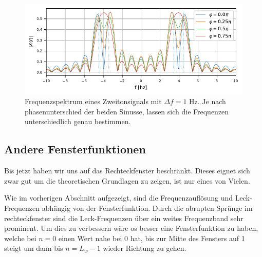 \begin{figure}
    \centering
    \includegraphics{papers/sonogramm/images/twoharmphasediff.pdf}
    \caption{Frequenzspektrum eines Zweitonsignals mit $\Delta f = 1$ Hz.
    Je nach phasenunterschied der beiden Sinusse, lassen sich die Frequenzen unterschiedlich
    genau bestimmen.
    \label{sonogramm:freqdiffdemo}
    }
\end{figure}

\subsection{Andere Fensterfunktionen}
Bis jetzt haben wir uns auf das Rechteckfenster beschränkt.
Dieses eignet sich zwar gut um die theoretischen Grundlagen zu zeigen,
ist nur eines von Vielen.

Wie im vorherigen Abschnitt aufgezeigt, sind die Frequenzauflösung und 
Leck-Frequenzen abhängig von der Fensterfunktion.
Durch die abrupten Sprünge im rechteckfenster sind die Leck-Frequenzen 
über ein weites Frequenzband sehr prominent.
Um dies zu verbessern wäre os besser eine Fensterfunktion zu haben,
welche bei $n = 0$ einen Wert nahe bei 0 hat,
bis zur Mitte des Fensters auf 1 steigt um dann bis $n = L_w -1$ wieder Richtung zu gehen. 

